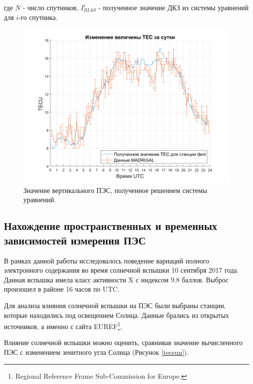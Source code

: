 \documentclass[a4paper]{article}
\begin{document}
где $N$ - число спутников, $I_{BIAS}^i$ - полученное значение ДКЗ из системы уравнений для $i$-го спутника.

\begin{figure}[h!]
\centering
\includegraphics[width = 1\linewidth]{pics/clean_pics/tec_madrigal.png}
\caption{Значение вертикального ПЭС, полученное решением системы уравнений.}
\label{solvedtec}
\end{figure}


\subsection{Нахождение пространственных и временных зависимостей измерения ПЭС}
В рамках данной работы исследовалось поведение вариаций полного электронного содержания во время солнечной вспышки 10 сентября 2017 года. Данная вспышка имела класс активности X с индексом 9.8 баллов. Выброс произошел в районе 16 часов по UTC.

Для анализа влияния солнечной вспышки на ПЭС были выбраны станции, которые находились под освещением Солнца. Данные брались из открытых источников, а именно с сайта EUREF\footnote{Regional Reference Frame Sub-Commission for Europe.}.

Влияние солнечной вспышки можно оценить, сравнивая значение вычисленного ПЭС с изменением зенитного угла Солнца (Рисунок \ref{tecsun}). 
\end{document}
